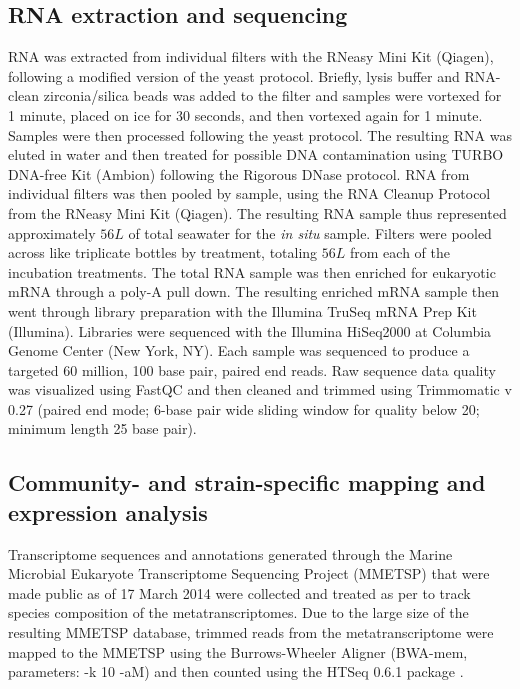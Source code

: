 \subsection{RNA extraction and sequencing}
RNA was extracted from individual filters with the RNeasy Mini Kit (Qiagen), following a modified version of the yeast protocol. Briefly, lysis buffer and RNA-clean zirconia/silica beads was added to the filter and samples were vortexed for 1 minute, placed on ice for 30 seconds, and then vortexed again for 1 minute. Samples were then processed following the yeast protocol. The resulting RNA was eluted in water and then treated for possible DNA contamination using TURBO DNA-free Kit (Ambion) following the Rigorous DNase protocol. RNA from individual filters was then pooled by sample, using the RNA Cleanup Protocol from the RNeasy Mini Kit (Qiagen). The resulting RNA sample thus represented approximately $56 L$ of total seawater for the \textit{in situ} sample. Filters were pooled across like triplicate bottles by treatment, totaling $56 L$ from each of the incubation treatments. The total RNA sample was then enriched for eukaryotic mRNA through a poly-A pull down. The resulting enriched mRNA sample then went through library preparation with the Illumina TruSeq mRNA Prep Kit (Illumina). Libraries were sequenced with the Illumina HiSeq2000 at Columbia Genome Center (New York, NY). Each sample was sequenced to produce a targeted 60 million, 100 base pair, paired end reads. Raw sequence data quality was visualized using FastQC and then cleaned and trimmed using Trimmomatic v 0.27 (paired end mode; 6-base pair wide sliding window for quality below 20; minimum length 25 base pair). 
\subsection{Community- and strain-specific mapping and expression analysis}
Transcriptome sequences and annotations generated through the Marine Microbial Eukaryote Transcriptome Sequencing Project (MMETSP) that were made public as of 17 March 2014 were collected and treated as per \citet{Alexander2015a} to track species composition of the metatranscriptomes. Due to the large size of the resulting MMETSP database, trimmed reads from the metatranscriptome were mapped to the MMETSP using the Burrows-Wheeler Aligner \citep{Li2010} (BWA-mem, parameters: -k 10 -aM) and then counted using the HTSeq 0.6.1 package \citep{Anders2014}. \par

